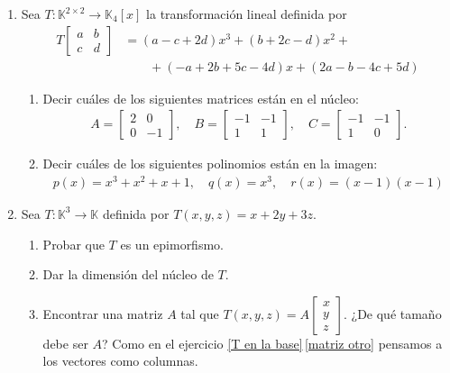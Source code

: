 \begin{enumerate}[topsep=6pt, itemsep=.4cm]
        \item Sea $T:\mathbb{K}^{2\times 2}\longrightarrow\mathbb{K}_{4}[x]$ la transformación lineal definida por
        \begin{align*}
        T   \begin{bmatrix}  a&b\\c&d \end{bmatrix} &= (a-c+2d)x^3+(b+2c-d)x^2+ \\
        &\qquad+(-a+2b+5c-4d)x+(2a-b-4c+5d)
        \end{align*}
        \begin{enumerate}
            \item\label{tl-matrices-pol-a} Decir cuáles de los siguientes matrices están en el núcleo:
                \begin{align*}
                    A=\begin{bmatrix}
                        2&0\\0&-1
                    \end{bmatrix},
                \quad
                B=\begin{bmatrix}
                    -1&-1\\1&1
                \end{bmatrix},
                \quad
                C=\begin{bmatrix}
                    -1&-1\\1&0
                \end{bmatrix}.
                \end{align*}
            \item\label{tl-matrices-pol-b} Decir cuáles de los siguientes polinomios están en la imagen:
                \begin{align*}
                    p(x)=x^3+x^2+x+1,\quad q(x)=x^3, \quad r(x)=(x-1)(x-1) 
                \end{align*}
        \end{enumerate}
    
    \rta
    
    \item\label{funcional ej}  Sea $T:\mathbb{K}^3\longrightarrow\mathbb{K}$ definida por $T(x,y,z)=x+2y+3z$.
    \begin{enumerate}
        \item\label{funcional ej a} Probar que $T$ es un epimorfismo.
        \item\label{funcional ej b} Dar la dimensión del núcleo de $T$.
        \item\label{funcional ej c} Encontrar una matriz $A$ tal que
            $T(x,y,z)=A\begin{bmatrix}
            x\\y\\z \end{bmatrix}$. ¿De qué tamaño debe ser $A$? Como en el ejercicio \ref{T en la base}\,\ref{matriz otro} pensamos a los vectores como columnas. 
    \end{enumerate}


\end{enumerate}
